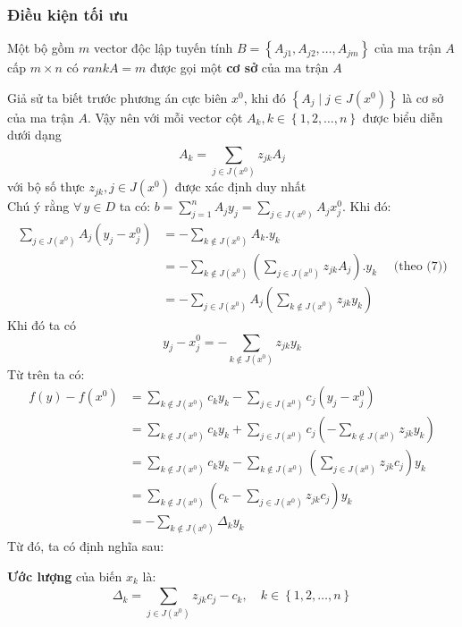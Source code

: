 \documentclass[12pt,a4paper]{article}\author{Nguyễn Nho Dũng}
\newcommand{\kniem}[1]{{\sffamily\bfseries #1}}
\newcommand{\taphop}[1]{\left\{#1\right\}}
\newcommand{\ngoacto}[1]{\left(#1\right)}
\newcommand{\tong}[1]{\sum_{#1}}
\newcommand{\tonglanluot}[2]{\sum_{#1}^{#2}}
\begin{document}
\subsubsection{Điều kiện tối ưu}
\begin{dnghia}
	Một bộ gồm $m$ vector độc lập tuyến tính $B = \taphop{A_{j1}, A_{j2}, \ldots, A_{jm}}$ của ma trận $A$ cấp $m\times n$ có $rank A = m$ được gọi một \kniem{cơ sở} của ma trận $A$
\end{dnghia}
Giả sử ta biết trước phương án cực biên $x^0$, khi đó $\taphop{A_j \mid j\in J(x^0)}$ là cơ sở của ma trận $A$. Vậy nên với mỗi vector cột $A_k, k\in\taphop{1,2,\ldots,n}$ được biểu diễn dưới dạng
\begin{equation}
	A_k = \tonglanluot{j\in J\ngoacto{x^0}}{} z_{jk}A_j
\end{equation} với bộ số thực $z_{jk}, j\in J\ngoacto{x^0}$ được xác định duy nhất\\
Chú ý rằng $\forall\, y\in D$ ta có: $b = \tonglanluot{j = 1}{n} A_jy_j= \tong{j\in J(x^0)} A_jx^0_j$. Khi đó:
\begin{align*}
	\tong{j\in J(x^0)} A_j\ngoacto{y_j - x^0_j} &= -\tong{k\notin J(x^0)} A_k.y_k\\
	&= -\tong{k\notin J(x^0)} \ngoacto{\tonglanluot{j\in J\ngoacto{x^0}}{} z_{jk}A_j}.y_k\quad\text{ (theo (7))}\\
	&= -\tong{j\in J(x^0)} A_j\ngoacto{\tong{k\notin J(x^0)} z_{jk} y_k}
\end{align*}
Khi đó ta có \begin{equation}
	y_j - x^0_j = -\tong{k\notin J(x^0)} z_{jk} y_k
\end{equation}
Từ trên ta có:
\begin{align*}
	f(y) - f(x^0) &= \tong{k\notin J(x^0)} c_ky_k - \tong{j\in J(x^0)} c_j\ngoacto{y_j - x^0_j}\\
	&= \tong{k\notin J(x^0)} c_ky_k + \tong{j\in J(x^0)} c_j\ngoacto{-\tong{k\notin J(x^0)} z_{jk} y_k}\\
	&= \tong{k\notin J(x^0)} c_ky_k - \tong{k\notin J(x^0)} \ngoacto{\tong{j\in J(x^0)} z_{jk}c_j} y_k \\
	&= \tong{k\notin J(x^0)} \ngoacto{c_k -\tong{j\in J(x^0)} z_{jk}c_j} y_k \\
	&= -\tong{k\notin J(x^0)} \Delta_ky_k
\end{align*}
Từ đó, ta có định nghĩa sau:
\begin{dnghia}
	\kniem{Ước lượng} của biến $x_k$ là: $$\Delta_k = \tonglanluot{j\in J\ngoacto{x^0}}{} z_{jk}c_j - c_k,\quad k\in\taphop{1,2,\ldots,n}$$
\end{dnghia}
\end{document}
